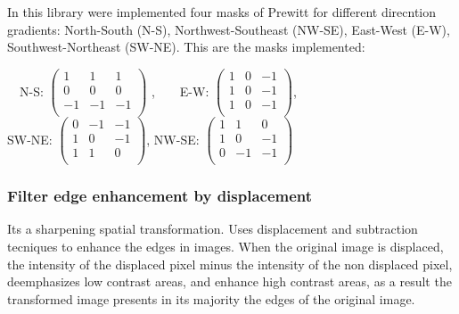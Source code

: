 \documentclass[a4paper]{article}
\begin{document}
In this library were implemented four masks of Prewitt for different direcntion  gradients: North-South (N-S), Northwest-Southeast (NW-SE), East-West (E-W), Southwest-Northeast (SW-NE). This are the masks implemented: \\
\begin{center}
\ \ N-S: \begin{math}
   \begin{pmatrix} 
   1 & 1 & 1 \\ 
   0 & 0 & 0 \\
   -1 & -1 & -1 \\ 
   \end{pmatrix}
\end{math} ,\ \ \ \  E-W:
\begin{math}
   \begin{pmatrix} 
   1 & 0 & -1 \\ 
   1 & 0 & -1 \\
   1 & 0 & -1 \\ 
   \end{pmatrix}
\end{math},  \\ SW-NE: \begin{math}
   \begin{pmatrix} 
   0 & -1 & -1 \\ 
   1 & 0 & -1 \\
   1 & 1 & 0 \\ 
   \end{pmatrix}
\end{math},  NW-SE: \begin{math}
   \begin{pmatrix} 
   1 &1 & 0 \\ 
   1 & 0 & -1 \\
   0 & -1 & -1 \\ 
   \end{pmatrix}
\end{math}\\
\end{center}

\subsubsection{Filter edge enhancement by displacement}

Its a sharpening spatial transformation. Uses displacement and subtraction tecniques to enhance the edges in images. When the original image is displaced, the intensity of the displaced pixel minus the intensity of the non displaced pixel, deemphasizes low contrast areas, and enhance high contrast areas, as a result the transformed image presents  in its majority the edges of the original image.
\end{document}
